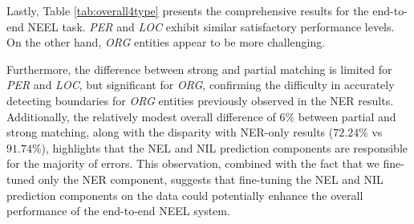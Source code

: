 Lastly, Table \ref{tab:overall4type} presents the comprehensive results for the end-to-end NEEL task. \textit{PER} and \textit{LOC} exhibit similar satisfactory performance levels. On the other hand, \textit{ORG} entities appear to be more challenging.

Furthermore, the difference between strong and partial matching is limited for \textit{PER} and \textit{LOC}, but significant for \textit{ORG}, confirming the difficulty in accurately detecting boundaries for \textit{ORG} entities previously observed in the NER results. Additionally, the relatively modest overall difference of $6\%$ between partial and strong matching, along with the disparity with NER-only results ($72.24\%$ vs $91.74\%$), highlights that the NEL and NIL prediction components are responsible for the majority of errors. This observation, combined with the fact that we fine-tuned only the NER component, suggests that fine-tuning the NEL and NIL prediction components on the data could potentially enhance the overall performance of the end-to-end NEEL system.

